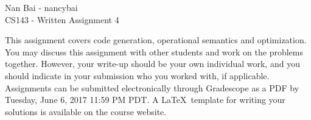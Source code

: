 \documentclass[11pt]{article}
\begin{document}
\begin{center}
\LARGE Nan Bai - nancybai\\
\Large CS143 - Written Assignment 4
\end{center}


This assignment covers code generation, operational semantics and optimization. You may discuss this assignment with other students and work on the problems together. However, your write-up should be your own individual work, and you should indicate in your submission who you worked with, if applicable. Assignments can be submitted electronically through Gradescope as a PDF by Tuesday, June 6, 2017 11:59 PM PDT. A \LaTeX \ template for writing your solutions is available on the course website.
\end{document}

